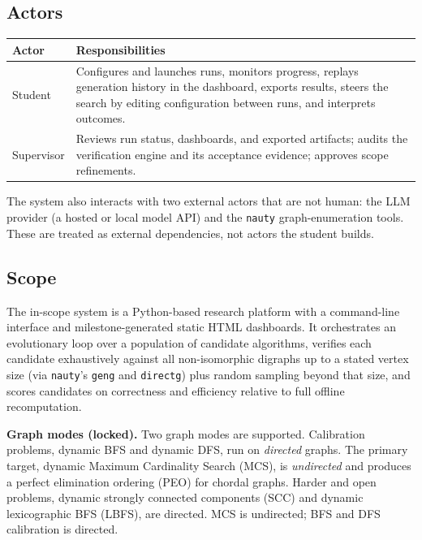 \documentclass[12pt,a4paper]{article}
\begin{document}
\subsection{Actors}

\begin{center}
\begin{tabular}{@{}ll@{}}
\toprule
\textbf{Actor} & \textbf{Responsibilities} \\
\midrule
Student & Configures and launches runs, monitors progress, replays generation history in the dashboard, exports results, steers the search by editing configuration between runs, and interprets outcomes. \\
Supervisor & Reviews run status, dashboards, and exported artifacts; audits the verification engine and its acceptance evidence; approves scope refinements. \\
\bottomrule
\end{tabular}
\end{center}

The system also interacts with two external actors that are not human: the LLM provider (a hosted or local model API) and the \texttt{nauty} graph-enumeration tools. These are treated as external dependencies, not actors the student builds.

\subsection{Scope}

The in-scope system is a Python-based research platform with a command-line interface and milestone-generated static HTML dashboards. It orchestrates an evolutionary loop over a population of candidate algorithms, verifies each candidate exhaustively against all non-isomorphic digraphs up to a stated vertex size (via \texttt{nauty}'s \texttt{geng} and \texttt{directg}) plus random sampling beyond that size, and scores candidates on correctness and efficiency relative to full offline recomputation.

\textbf{Graph modes (locked).} Two graph modes are supported. Calibration problems, dynamic BFS and dynamic DFS, run on \emph{directed} graphs. The primary target, dynamic Maximum Cardinality Search (MCS), is \emph{undirected} and produces a perfect elimination ordering (PEO) for chordal graphs. Harder and open problems, dynamic strongly connected components (SCC) and dynamic lexicographic BFS (LBFS), are directed. MCS is undirected; BFS and DFS calibration is directed.
\end{document}
